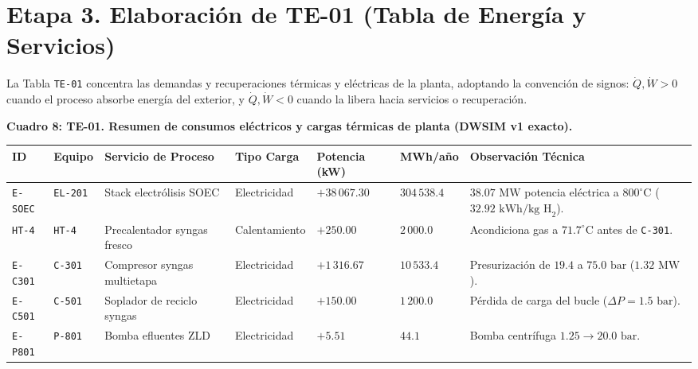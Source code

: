 \documentclass[11pt,letterpaper]{article}
\begin{document}
\clearpage
\section{Etapa 3. Elaboración de TE-01 (Tabla de Energía y Servicios)}

La Tabla \texttt{TE-01} concentra las demandas y recuperaciones térmicas y eléctricas de la planta, adoptando la convención de signos: $\dot{Q}, \dot{W} > 0$ cuando el proceso absorbe energía del exterior, y $\dot{Q}, \dot{W} < 0$ cuando la libera hacia servicios o recuperación.

\begin{center}
\footnotesize
\setlength{\tabcolsep}{3.5pt}
\renewcommand{\arraystretch}{1.04}
\textbf{Cuadro 8: TE-01. Resumen de consumos eléctricos y cargas térmicas de planta (DWSIM v1 exacto).}\\[2pt]
\begin{tabularx}{\textwidth}{>{\raggedright\arraybackslash\ttfamily}p{1.7cm} >{\raggedright\arraybackslash\ttfamily}p{1.5cm} >{\raggedright\arraybackslash}p{3.4cm} >{\raggedright\arraybackslash}p{2.2cm} >{\raggedleft\arraybackslash}p{2.0cm} >{\raggedleft\arraybackslash}p{1.7cm} >{\raggedright\arraybackslash}X}
\toprule
\textbf{ID} & \textbf{Equipo} & \textbf{Servicio de Proceso} & \textbf{Tipo Carga} & \textbf{Potencia (kW)} & \textbf{MWh/año} & \textbf{Observación Técnica} \\
\midrule
\texttt{E-SOEC} & \texttt{EL-201} & Stack electrólisis SOEC & Electricidad & $+38\,067.30$ & $304\,538.4$ & $38.07\text{ MW}$ potencia eléctrica a $800^\circ\text{C}$ ($32.92\text{ kWh/kg H}_2$). \\
\texttt{HT-4} & \texttt{HT-4} & Precalentador syngas fresco & Calentamiento & $+250.00$ & $2\,000.0$ & Acondiciona gas a $71.7^\circ\text{C}$ antes de \texttt{C-301}. \\
\texttt{E-C301} & \texttt{C-301} & Compresor syngas multietapa & Electricidad & $+1\,316.67$ & $10\,533.4$ & Presurización de $19.4$ a $75.0\text{ bar}$ ($1.32\text{ MW}$). \\
\texttt{E-C501} & \texttt{C-501} & Soplador de reciclo syngas & Electricidad & $+150.00$ & $1\,200.0$ & Pérdida de carga del bucle ($\Delta P = 1.5\text{ bar}$). \\
\texttt{E-P801} & \texttt{P-801} & Bomba efluentes ZLD & Electricidad & $+5.51$ & $44.1$ & Bomba centrífuga $1.25 \to 20.0\text{ bar}$. \\

\end{tabularx}
\end{center}
\end{document}

